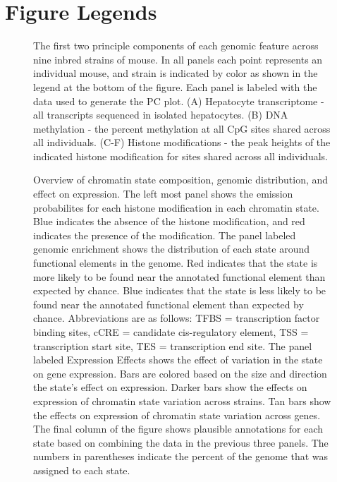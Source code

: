 \documentclass[10pt,letterpaper]{article}
\begin{document}
\hypertarget{figure-legends}{%
\section{Figure Legends}\label{figure-legends}}

\begin{figure}[ht]
\centering
\caption{The first two principle components of each genomic feature across
nine inbred strains of mouse. In all panels each point represents
an individual mouse, and strain is indicated by color as shown in
the legend at the bottom of the figure. Each panel is labeled with
the data used to generate the PC plot. (A) Hepatocyte transcriptome - 
all transcripts sequenced in isolated hepatocytes. (B) DNA methylation - 
the percent methylation at all CpG sites shared across all individuals. 
(C-F) Histone modifications - the peak heights of the indicated histone
modification for sites shared across all individuals.}
\label{fig:pc_plots}
\end{figure}

\begin{figure}[ht]
\centering
\caption{Overview of chromatin state composition, genomic distribution,
and effect on expression. The left most panel shows the emission
probabilites for each histone modification in each chromatin state. 
Blue indicates the absence of the histone modification, and red 
indicates the presence of the modification. The panel labeled
genomic enrichment shows the distribution of each state around 
functional elements in the genome. Red indicates that the
state is more likely to be found near the annotated functional 
element than expected by chance. Blue indicates that the state
is less likely to be found near the annotated functional element
than expected by chance. Abbreviations are as follows: TFBS = 
transcription factor binding sites, cCRE = candidate cis-regulatory
element, TSS = transcription start site, 
TES = transcription end site. The panel labeled Expression Effects 
shows the effect of variation in the state on gene expression. 
Bars are colored based on the size and direction the state's effect on
expression. Darker bars show the effects on expression of chromatin 
state variation across strains. Tan bars show the effects on expression
of chromatin state variation across genes. The final column of the figure 
shows plausible annotations for each state based on combining the data in 
the previous three panels. The numbers in parentheses indicate the percent 
of the genome that was assigned to each state.}
\label{fig:state_overview}
\end{figure}
\end{document}
